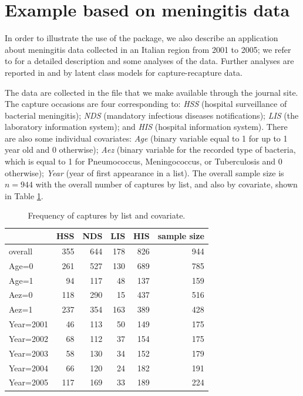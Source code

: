 \section{Example based on meningitis data}
%
In order to illustrate the use of the package, we also describe an application about meningitis data collected in an Italian region from 2001 to 2005; we refer to \cite{PGRossi2009} for a detailed description and some analyses of the data.
Further analyses are reported in \cite{bartolucci2018latent} and \cite{bartolucci2024estimating} by latent class models for capture-recapture data.

The data are collected in the file  that we make available through the journal site.
The capture occasions are four corresponding to: {\em HSS} (hospital surveillance of bacterial meningitis); {\em NDS} (mandatory infectious diseases notifications); {\em LIS} (the laboratory information system); and {\em HIS} (hospital information system).
There are also some individual covariates: {\em Age} (binary variable equal to 1 for up to 1 year old and 0 otherwise); {\em  Aez} (binary variable for the recorded type of bacteria, which is equal to 1 for Pneumococcus, Meningococcus, or Tuberculosis and 0 otherwise); {\em Year} (year of first appearance in a list).
The overall sample size is $n=944$ with the overall number of captures by list, and also by covariate, shown in Table \ref{tab:descr}.

\begin{table}[ht]
\centering
\begin{tabular}{lrrrrr}
  \toprule
 & HSS & NDS & LIS & HIS & sample size \\
  \midrule
  overall & 355 & 644 & 178 & 826 & 944 \\
  \midrule
  Age=0 & 261 & 527 & 130 & 689 & 785 \\
  Age=1 & 94 & 117 & 48 & 137 & 159 \\
  \midrule
  Aez=0 & 118 & 290 & 15 & 437 & 516 \\
  Aez=1 & 237 & 354 & 163 & 389 & 428 \\
  \midrule
  Year=2001 & 46 & 113 & 50 & 149 & 175 \\
  Year=2002 & 68 & 112 & 37 & 154 & 175 \\
  Year=2003 & 58 & 130 & 34 & 152 & 179 \\
  Year=2004 & 66 & 120 & 24 & 182 & 191 \\
  Year=2005 & 117 & 169 & 33 & 189 & 224 \\
   \bottomrule
\end{tabular}
\caption{Frequency of captures by list and covariate.}\label{tab:descr}
\end{table}

